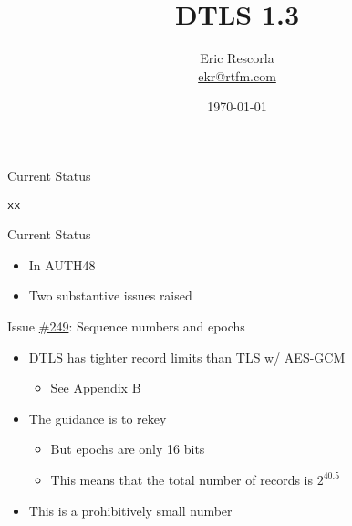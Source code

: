 \documentclass[helvetica]{beamer}
\title{DTLS 1.3}
\author{Eric Rescorla \\\url{ekr@rtfm.com}}
\date{\today}
\begin{document}
\begin{frame}
  \titlepage
\end{frame}


\begin{frame}{Current Status}

  \verb^xx^

\end{frame}


\begin{frame}{Current Status}

  \begin{itemize}
  \item In AUTH48
  \item Two substantive issues raised
  \end{itemize}
\end{frame}

\begin{frame}{Issue \href{https://github.com/tlswg/dtls13-spec/issues/249}{\#249}: Sequence numbers and epochs}

  \begin{itemize}
  \item DTLS has tighter record limits than TLS w/ AES-GCM
    \begin{itemize}
    \item See Appendix B      
    \end{itemize}

  \item The guidance is to rekey
    \begin{itemize}
    \item But epochs are only 16 bits
    \item This means that the total number of records is $2^{40.5}$     
    \end{itemize}

  \item This is a prohibitively small number    
  \end{itemize}
\end{frame}
\end{document}
